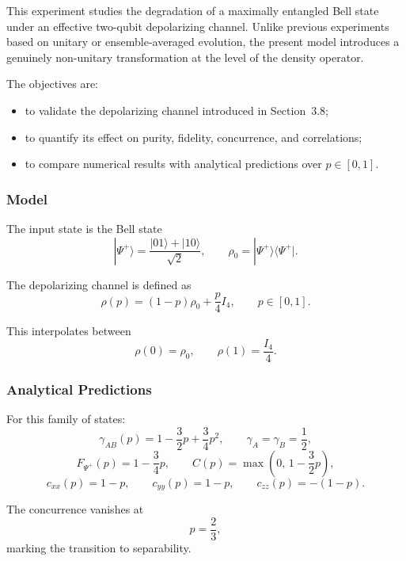 \documentclass[a4paper]{article}
\begin{document}
This experiment studies the degradation of a maximally entangled Bell state under an effective two-qubit depolarizing channel. Unlike previous experiments based on unitary or ensemble-averaged evolution, the present model introduces a genuinely non-unitary transformation at the level of the density operator.

The objectives are:
\begin{itemize}
\item to validate the depolarizing channel introduced in Section~3.8;
\item to quantify its effect on purity, fidelity, concurrence, and correlations;
\item to compare numerical results with analytical predictions over \(p \in [0,1]\).
\end{itemize}


\subsubsection{Model}

The input state is the Bell state
\[
|\Psi^+\rangle = \frac{|01\rangle + |10\rangle}{\sqrt{2}},
\qquad
\rho_0 = |\Psi^+\rangle\langle\Psi^+|.
\]

The depolarizing channel is defined as
\[
\rho(p) = (1-p)\rho_0 + \frac{p}{4}I_4,
\qquad p \in [0,1].
\]

This interpolates between
\[
\rho(0)=\rho_0,
\qquad
\rho(1)=\frac{I_4}{4}.
\]


\subsubsection{Analytical Predictions}

For this family of states:
\[
\gamma_{AB}(p)=1-\frac{3}{2}p+\frac{3}{4}p^2,
\qquad
\gamma_A=\gamma_B=\frac{1}{2},
\]
\[
F_{\Psi^+}(p)=1-\frac{3}{4}p,
\qquad
C(p)=\max\!\left(0,\,1-\frac{3}{2}p\right),
\]
\[
c_{xx}(p)=1-p,\qquad
c_{yy}(p)=1-p,\qquad
c_{zz}(p)=-(1-p).
\]

The concurrence vanishes at
\[
p=\frac{2}{3},
\]
marking the transition to separability.

\end{document}

